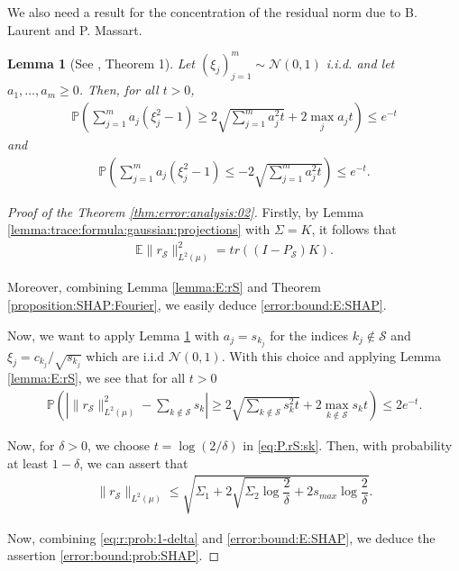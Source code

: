 \documentclass[letterpaper,11pt]{article}
\numberwithin{equation}{section}
\newtheorem{lemma}[theorem]{Lemma}
\renewcommand{\leq}{\leqslant}
\renewcommand{\geq}{\geqslant}
\numberwithin{equation}{section}
\begin{document}
We also need a result for the concentration of the residual norm due to B. Laurent and P. Massart. 

\begin{lemma}[See \cite{laurent2000adaptive}, Theorem 1]
    \label{lemma:Laurent:Massart}
    Let $(\xi_j)_{j=1}^m \sim \mathcal{N}(0,1)$ i.i.d. and let $a_1,\ldots, a_m \geq 0$. Then, for all $t>0$,
    \begin{align}
        \mathbb{P} \left( \sum_{j=1}^{m} a_j (\xi_j^2 -1) \geq 2\sqrt{\sum_{j=1}^m a_j^2 t} + 2\max_j a_j t \right) \leq e^{-t}
    \end{align}
    and
    \begin{align*}
        \mathbb{P}\left(\sum_{j=1}^m a_j(\xi_j^2 -1) \leq -2 \sqrt{\sum_{j=1}^m a_j^2 t} \right) \leq e^{-t}.
    \end{align*}
\end{lemma}


\begin{proof}[Proof of the Theorem \ref{thm:error:analysis:02}]
    Firstly, by Lemma \ref{lemma:trace:formula:gaussian:projections} with $\Sigma=K$, it follows that 
    \begin{align*}
        \mathbb{E}\|r_{\mathcal{S}}\|_{L^2(\mu)}^2 =tr((I-P_{\mathcal{S}})K).
    \end{align*}

    Moreover, combining Lemma \ref{lemma:E:rS} and Theorem \ref{proposition:SHAP:Fourier}, we easily deduce \eqref{error:bound:E:SHAP}.

    Now, we want to apply Lemma \ref{lemma:Laurent:Massart} with $a_j=s_{k_j}$ for the indices $k_j\notin \mathcal{S}$ and $\xi_j=c_{k_j}/\sqrt{s_{k_j}}$ which are i.i.d $\mathcal{N}(0,1)$. With this choice and applying Lemma \ref{lemma:E:rS}, we see that for all $t>0$ 
    \begin{align}
        \label{eq:P.rS:sk}
        \mathbb{P} \left( |\|r_{\mathcal{S}}\|_{L^2(\mu)}^2 - \sum_{k\notin \mathcal{S}} s_k | \geq 2\sqrt{\sum_{k\notin \mathcal{S}} s_k^2 t} + 2\max_{k\notin \mathcal{S}} s_k t \right) \leq 2e^{-t}. 
    \end{align}

    Now, for $\delta>0$, we choose $t=\log(2/\delta)$ in \eqref{eq:P.rS:sk}. Then, with probability at least $1-\delta$, we can assert that
    \begin{align}
        \label{eq:r:prob:1-delta}
        \|r_{\mathcal{S}}\|_{L^2(\mu)} \leq \sqrt{ \Sigma_1 + 2\sqrt{ \Sigma_2 \log \dfrac{2}{\delta}} +2s_{max} \log \dfrac{2}{\delta}}.
    \end{align}

    Now, combining \eqref{eq:r:prob:1-delta} and \eqref{error:bound:E:SHAP}, we deduce the assertion \eqref{error:bound:prob:SHAP}.
    
\end{proof}
\end{document}
